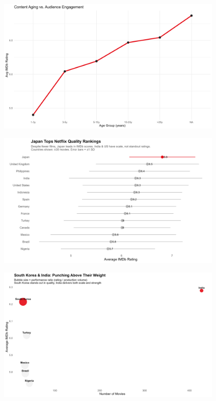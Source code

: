\documentclass[
  man,floatsintext]{apa6}
\begin{document}
\begin{figure}

{\centering \includegraphics[width=0.9\linewidth]{../Question3/Results/audienceengage} 

}

\caption{ }\label{fig:audienceengage-1}
\end{figure}
\begin{figure}

{\centering \includegraphics[width=0.9\linewidth]{../Question3/Results/countryrating} 

}

\caption{ }\label{fig:audienceengage-2}
\end{figure}
\begin{figure}

{\centering \includegraphics[width=0.9\linewidth]{../Question3/Results/emergers} 

}

\caption{ }\label{fig:audienceengage-3}
\end{figure}
\end{document}
